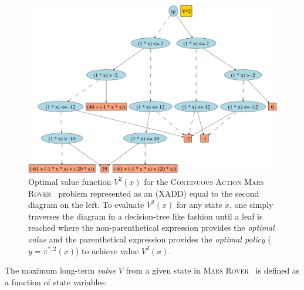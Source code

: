 \documentclass[twoside,11pt]{article}
\newcommand{\MarsRover}{\textsc{Mars Rover }}
\begin{document}
\begin{figure}[t!]
\begin{minipage}[b]{0.48\linewidth}
\end{minipage}
\begin{minipage}[b]{0.48\linewidth}
\includegraphics[width=1\textwidth]{pics/roverdot.pdf}
\vspace{6mm}

\caption{\footnotesize Optimal value function $V^2(x)$ for the
\textsc{Continuous Action}  \MarsRover\ problem represented as an (XADD) equal to the second diagram on the left. 
To evaluate
$V^2(x)$ for any state $x$, one simply traverses the diagram in a
decision-tree like fashion until a leaf is reached where the
non-parenthetical expression provides the \emph{optimal value} and the
parenthetical expression provides the \emph{optimal policy} 
($y = \pi^{*,2}(x)$) to achieve value $V^2(x)$.}
\label{fig:opt_val_pol}
\vspace{-5mm}
\end{minipage}
\end{figure}
The maximum long-term \emph{value} $V$ from a given state in \MarsRover\ 
is defined as a function of state variables:
\end{document}
